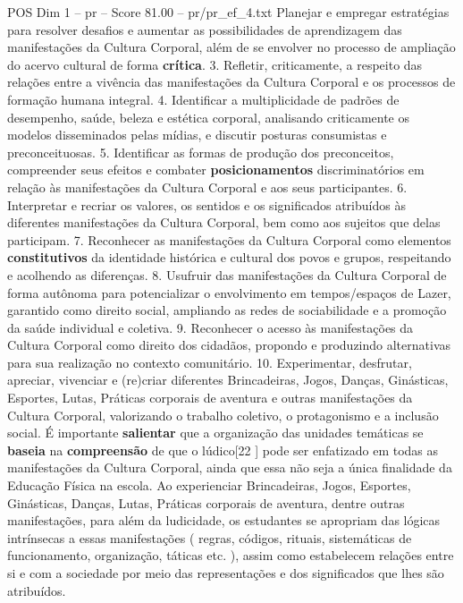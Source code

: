 \begin{textsample}{POS Dim 1 – pr – Score 81.00 – pr/pr\_ef\_4.txt}
Planejar e empregar estratégias para resolver desafios e aumentar as possibilidades de aprendizagem das manifestações da Cultura Corporal, além de se envolver no processo de ampliação do acervo cultural de forma \textbf{crítica}. 3.
Refletir, criticamente, a respeito das relações entre a vivência das manifestações da Cultura Corporal e os processos de formação humana integral. 4.
Identificar a multiplicidade de padrões de desempenho, saúde, beleza e estética corporal, analisando criticamente os modelos disseminados pelas mídias, e discutir posturas consumistas e preconceituosas. 5.
Identificar as formas de produção dos preconceitos, compreender seus efeitos e combater \textbf{posicionamentos} discriminatórios em relação às manifestações da Cultura Corporal e aos seus participantes. 6.
Interpretar e recriar os valores, os sentidos e os significados atribuídos às diferentes manifestações da Cultura Corporal, bem como aos sujeitos que delas participam. 7.
Reconhecer as manifestações da Cultura Corporal como elementos \textbf{constitutivos} da identidade histórica e cultural dos povos e grupos, respeitando e acolhendo as diferenças. 8.
Usufruir das manifestações da Cultura Corporal de forma autônoma para potencializar o envolvimento em tempos/espaços de Lazer, garantido como direito social, ampliando as redes de sociabilidade e a promoção da saúde individual e coletiva. 9.
Reconhecer o acesso às manifestações da Cultura Corporal como direito dos cidadãos, propondo e produzindo alternativas para sua realização no contexto comunitário. 10.
Experimentar, desfrutar, apreciar, vivenciar e (re)criar diferentes Brincadeiras, Jogos, Danças, Ginásticas, Esportes, Lutas, Práticas corporais de aventura e outras manifestações da Cultura Corporal, valorizando o trabalho coletivo, o protagonismo e a inclusão social.
É importante \textbf{salientar} que a organização das unidades temáticas se \textbf{baseia} na \textbf{compreensão} de que o lúdico[22 ] pode ser enfatizado em todas as manifestações da Cultura Corporal, ainda que essa não seja a única finalidade da Educação Física na escola.
Ao experienciar Brincadeiras, Jogos, Esportes, Ginásticas, Danças, Lutas, Práticas corporais de aventura, dentre outras manifestações, para além da ludicidade, os estudantes se apropriam das lógicas intrínsecas a essas manifestações ( regras, códigos, rituais, sistemáticas de funcionamento, organização, táticas etc. ), assim como estabelecem relações entre si e com a sociedade por meio das representações e dos significados que lhes são atribuídos.

\end{textsample}
